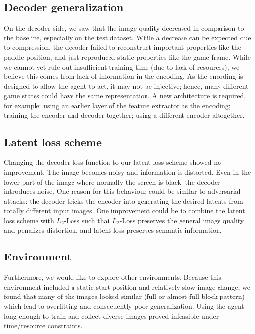 \subsection{Decoder generalization}
On the decoder side, we saw that the image quality decreased in
comparison to the baseline, especially on the test dataset. While a decrease can
be expected due to compression, the decoder failed to reconstruct important
properties like the paddle position, and just reproduced static properties like
the game frame. While we cannot yet rule out insufficient training time (due to
lack of resources), we believe this comes from lack of information in the
encoding. As the encoding is designed to allow the agent to act, it may not be
injective; hence, many different game states could have the same representation. A
new architecture is required, for example: using an earlier layer of the feature
extractor as the encoding; training the encoder and decoder together; using a different encoder
altogether.

\subsection{Latent loss scheme}
Changing the decoder loss function to our latent loss scheme showed no
improvement. The image becomes noisy and information is distorted. Even
in the lower part of the image where normally the screen is black, the decoder introduces noise. One reason for this behaviour
could be similar to adversarial attacks: the decoder tricks
the encoder into generating the desired latents from totally different input images. One improvement could be to combine the latent loss scheme with $L_2$-Loss
such that $L_2$-Loss preserves the general image quality and penalizes distortion,
and latent loss preserves semantic information.

\subsection{Environment}
Furthermore, we would like to explore other environments. Because this
environment included a static start position and relatively slow image change,
we found that many of the images looked similar (full or almost full block
pattern) which lead to overfitting and consqeuently
poor generalization. Using the agent long enough to train and collect diverse
images proved infeasible under time/resource constraints.

